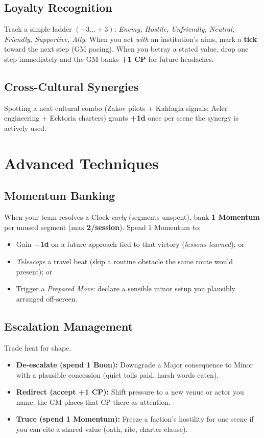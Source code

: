 \begin{multicols}{2}
\subsection{Loyalty Recognition}
Track a simple ladder \((-3\ldots+3)\): \emph{Enemy, Hostile, Unfriendly, Neutral, Friendly, Supportive, Ally}. When you act \emph{with} an institution’s aims, mark a \textbf{tick} toward the next step (GM pacing). When you betray a stated value, drop one step immediately and the GM banks \textbf{+1 CP} for future headaches.

\subsection{Cross-Cultural Synergies}
Spotting a neat cultural combo (Zakov pilots + Kahfagia signals; Aeler engineering + Ecktoria charters) grants \textbf{+1d} once per scene the synergy is actively used.

\section{Advanced Techniques}

\subsection{Momentum Banking}\label{sec:momentum-banking}
When your team resolves a Clock \emph{early} (segments unspent), bank \textbf{1 Momentum} per unused segment (max \textbf{2/session}). Spend 1 Momentum to:
\begin{itemize}
  \item Gain \textbf{+1d} on a future approach tied to that victory (\emph{lessons learned}); or
  \item \emph{Telescope} a travel beat (skip a routine obstacle the same route would present); or
  \item Trigger a \emph{Prepared Move}: declare a sensible minor setup you plausibly arranged off-screen.
\end{itemize}

\subsection{Escalation Management}
Trade heat for shape.
\begin{itemize}
  \item \textbf{De-escalate (spend 1 Boon):} Downgrade a Major consequence to Minor with a plausible concession (quiet tolls paid, harsh words eaten).
  \item \textbf{Redirect (accept +1 CP):} Shift pressure to a new venue or actor you name; the GM places that CP there as attention.
  \item \textbf{Truce (spend 1 Momentum):} Freeze a faction’s hostility for one scene if you can cite a shared value (oath, rite, charter clause).%
\end{itemize}


\end{multicols}

